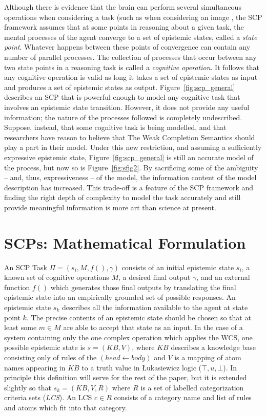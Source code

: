 \documentclass[
11pt, %
english, %
singlespacing, %
headsepline, %
]{MastersDoctoralThesis} %
\begin{document}
Although there is evidence that the brain can perform several simultaneous operations when considering a task (such as when considering an image \citep{sigman2008brain}, the SCP framework assumes that at some points in reasoning about a given task, the mental processes of the agent converge to a set of epistemic states, called a \textit{state point}. Whatever happens between these points of convergence can contain any number of parallel processes. The collection of processes that occur between any two state points in a reasoning task is called a \textit{cognitive operation}. It follows that any cognitive operation is valid as long it takes a set of epistemic states as input and produces a set of epistemic states as output. Figure~\ref{fig:scp_general} describes an SCP that is powerful enough to model any cognitive task that involves an epistemic state transition. However, it does not provide any useful information; the nature of the processes followed is completely undescribed. Suppose, instead, that some cognitive task is being modelled, and that researchers have reason to believe that The Weak Completion Semantics should play a part in their model. Under this new restriction, and assuming a sufficiently expressive epistemic state, Figure~\ref{fig:scp_general} is still an accurate model of the process, but now so is Figure~\ref{fig:sfig2}. By sacrificing some of the ambiguity -- and, thus, expressiveness -- of the model, the information content of the model description has increased. This trade-off is a feature of the SCP framework and finding the right depth of complexity to model the task accurately and still provide meaningful information is more art than science at present. 

\section{SCPs: Mathematical Formulation}
An SCP Task $\Pi=(s_i, M, f(), \gamma)$ consists of an initial epistemic state $s_i$, a known set of cognitive operations $M$, a desired final output $\gamma$, and an external function $f()$ which generates those final outputs by translating the final epistemic state into an empirically grounded set of possible responses. An epistemic state $s_k$ describes all the information available to the agent at state point $k$. The precise contents of an epistemic state should be chosen so that at least some $m \in M$ are able to accept that state as an input. In the case of a system containing only the one complex operation which applies the WCS, one possible epistemic state is $s=(KB,V)$, where $KB$ describes a knowledge base consisting only of rules of the $(head \leftarrow body)$ and $V$ is a mapping of atom names appearing in $KB$ to a truth value in \L ukasiewicz logic ($\top,u, \bot$). In principle this definition will serve for the rest of the paper, but it is extended slightly so that $s_k = (KB,V,R)$ where $R$ is a set of labelled categorization criteria sets (\textit{LCS}). An LCS $ c \in R$ consists of a category name and list of rules and atoms which fit into that category.
\end{document}
